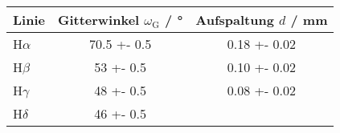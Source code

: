 \begin{tabular}{lSS}
\toprule
{Linie}   & {Gitterwinkel $\omega_\mathrm{G}$ / \si{\degree}} & {Aufspaltung $d$ / \si{\milli\metre}}\\
\midrule
H$\alpha$     & 70.5 +- 0.5      & 0.18 +- 0.02        \\
H$\beta$      & 53 +- 0.5        & 0.10 +- 0.02        \\
H$\gamma$     & 48 +- 0.5        & 0.08 +- 0.02        \\
H$\delta$     & 46 +- 0.5        &                     \\ 
\bottomrule
\end{tabular}